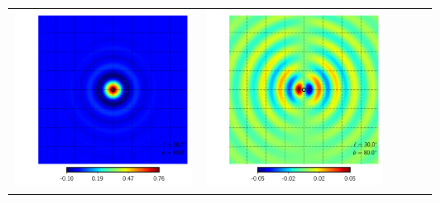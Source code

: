 \documentclass[a4paper,11pt]{article}
\begin{document}
\begin{figure}[!t]
\begin{center}
\begin{tabular}{m{8ex}m{}m{}|m{}m{}}
\hspace{\kernelfigspace}\includegraphics[width=\kernelfigwidth]{qu2ebqu_rker_I_lat80_lon30.pdf} &
\hspace{\kernelfigspace}\includegraphics[width=\kernelfigwidth]{qu2ebqu_iker_I_lat80_lon30.pdf} \\

\end{tabular}
\end{center}
\end{figure}
\end{document}

